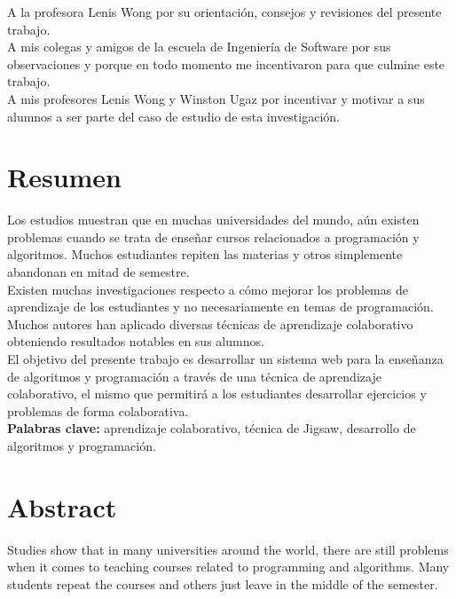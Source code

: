 A la profesora Lenis Wong por su orientación, consejos  y revisiones del presente trabajo.\\

A mis colegas y amigos de la escuela de Ingeniería de Software por sus observaciones y porque en todo momento me incentivaron para que culmine este trabajo.\\

A mis profesores Lenis Wong y Winston Ugaz por incentivar y motivar a sus alumnos a ser parte del caso de estudio de esta investigación.
\chapter*{Resumen}

Los estudios muestran que en muchas universidades del mundo, aún existen problemas cuando se trata de enseñar cursos relacionados a programación y algoritmos. Muchos estudiantes repiten las materias y otros simplemente abandonan en mitad de semestre.\\

Existen muchas investigaciones respecto a cómo mejorar los problemas de aprendizaje de los estudiantes y no necesariamente en temas de programación. Muchos autores han aplicado diversas técnicas de aprendizaje colaborativo obteniendo resultados notables en sus alumnos.\\

El objetivo del presente trabajo es desarrollar un sistema web para la enseñanza de algoritmos y programación a través de una técnica de aprendizaje colaborativo, el mismo que permitirá a los estudiantes desarrollar ejercicios y problemas de forma colaborativa.\\

\textbf{Palabras clave:} aprendizaje colaborativo, técnica de Jigsaw, desarrollo de algoritmos y programación.

\chapter*{Abstract}
Studies show that in many universities around the world, there are still problems when it comes to teaching courses related to programming and algorithms. Many students repeat the courses and others just leave in the middle of the semester. \\

